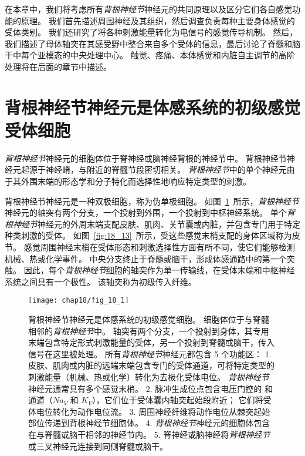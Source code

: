 在本章中，我们将考虑所有\textit{背根神经节}神经元的共同原理以及区分它们各自感觉功能的原理。
我们首先描述周围神经及其组织，然后调查负责每种主要身体感觉的受体类别。
我们还研究了将各种刺激能量转化为电信号的感觉传导机制。
然后，我们描述了母体轴突在其感受野中整合来自多个受体的信息，最后讨论了脊髓和脑干中每个亚模态的中央处理中心。
触觉、疼痛、本体感觉和内脏自主调节的高阶处理将在后面的章节中描述。



\section{背根神经节神经元是体感系统的初级感觉受体细胞}

\textit{背根神经节}神经元的细胞体位于脊神经或脑神经背根的神经节中。
背根神经节神经元起源于神经嵴，与附近的脊髓节段密切相关。
\textit{背根神经节}中的单个神经元由于其外围末端的形态学和分子特化而选择性地响应特定类型的刺激。


背根神经节神经元是一种双极细胞，称为伪单极细胞。 
如图~\ref{fig:18_1}~所示，\textit{背根神经节}神经元的轴突有两个分支，一个投射到外围，一个投射到中枢神经系统。
单个\textit{背根神经节}神经元的外周末端支配皮肤、肌肉、关节囊或内脏，并包含专门用于特定种类刺激的受体。 
如图~\ref{fig:18_13}~所示，受这些感觉末梢支配的身体区域称为皮节。
感觉周围神经末梢在受体形态和刺激选择性方面有所不同，使它们能够检测机械、热或化学事件。
中央分支终止于脊髓或脑干，形成体感通路中的第一个突触。
因此，每个\textit{背根神经节}细胞的轴突作为单一传输线，在受体末端和中枢神经系统之间具有一个极性。
该轴突称为初级传入纤维。


\begin{figure}[htbp]
	\centering
	\texttt{[image: chap18/fig\_18\_1]}
	\caption{背根神经节神经元是体感系统的初级感觉细胞。 
		细胞体位于与脊髓相邻的\textit{背根神经节}中。
		轴突有两个分支，一个投射到身体，其专用末端包含特定形式刺激能量的受体，另一个投射到脊髓或脑干，传入信号在这里被处理。 
		所有\textit{背根神经节}神经元都包含 5 个功能区：
		1. 皮肤、肌肉或内脏的远端末端包含专门的受体通道，可将特定类型的刺激能量（机械、热或化学）转化为去极化受体电位。 
		\textit{背根神经节}神经元通常具有多个感觉末梢。
		2. 脉冲生成位点包含电压门控的  和  通道（$Na_V$ 和 $K_V$），它们位于受体囊内轴突起始段附近； 它们将受体电位转化为动作电位流。 
		3. 周围神经纤维将动作电位从棘突起始部位传递到背根神经节细胞体。 
		4. \textit{背根神经节}神经元的细胞体包含在与脊髓或脑干相邻的神经节内。 
		5. 脊神经或脑神经将\textit{背根神经节}或三叉神经元连接到同侧脊髓或脑干。}
	\label{fig:18_1}
\end{figure}


